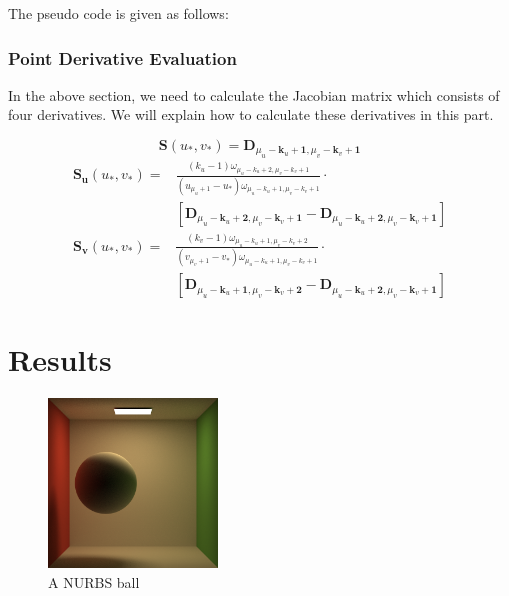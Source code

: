 \documentclass[acmtog]{acmart}
\begin{document}
The pseudo code is given as follows:  



\subsubsection{Point Derivative Evaluation}


In the above section, we need to calculate the Jacobian matrix which consists of four derivatives. We will explain how to calculate these derivatives in this part. 

\[
	\mathbf{S}(u_*, v_*) = \mathbf{D}_{\mu_u - \mathbf{k}_u + \mathbf{1}, \mu_v - \mathbf{k}_v + \mathbf{1}}	
\] 
\[\begin{aligned}
	\mathbf{S_u}(u_*, v_*) =& \frac{
		(k_u-1)\omega_{\mu_u - k_u + 2, \mu_v - k_v + 1}
	}{
		(u_{\mu_u + 1} - u_*)\omega_{\mu_u - k_u + 1, \mu_v - k_v + 1}
	}\cdot \\ &\left[
		\mathbf{D}_{\mu_u - \mathbf{k}_u + \mathbf{2}, \mu_v - \mathbf{k}_v + \mathbf{1}} - 
		\mathbf{D}_{\mu_u - \mathbf{k}_u + \mathbf{2}, \mu_v - \mathbf{k}_v + \mathbf{1}}
	\right]
\end{aligned}
\]
\[\begin{aligned}
	\mathbf{S_v}(u_*, v_*) =& \frac{
		(k_v-1)\omega_{\mu_u - k_u + 1, \mu_v - k_v + 2}
	}{
		(v_{\mu_v + 1} - v_*)\omega_{\mu_u - k_u + 1, \mu_v - k_v + 1}
	}\cdot \\ &\left[
		\mathbf{D}_{\mu_u - \mathbf{k}_u + \mathbf{1}, \mu_v - \mathbf{k}_v + \mathbf{2}} - 
		\mathbf{D}_{\mu_u - \mathbf{k}_u + \mathbf{2}, \mu_v - \mathbf{k}_v + \mathbf{1}}
	\right]
\end{aligned}
\]

\section{Results}


\begin{figure}[H]
	\centering
	\includegraphics[width=0.4\textwidth]{results/result600.png}
	\caption{A NURBS ball}
	\label{fig:result1}
\end{figure}
\end{document}
